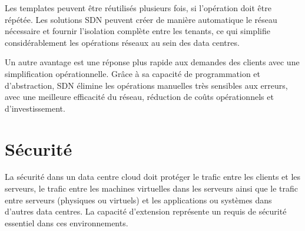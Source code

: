 Les templates peuvent être réutilisés plusieurs fois, si l'opération doit être répétée. Les solutions SDN peuvent créer de manière automatique le réseau nécessaire et fournir l'isolation complète entre les tenants, ce qui simplifie considérablement les opérations réseaux au sein des data centres. 

Un autre avantage est une réponse plus rapide aux demandes des clients avec une simplification opérationnelle. Grâce à sa capacité de programmation et d'abstraction, SDN élimine les opérations manuelles très sensibles aux erreurs, avec une meilleure efficacité du réseau, réduction de coûts opérationnels et d'investissement. \cite{leveragingSDNCloudNetworkServiceExample} \cite{leveragingSDNCloudDCWAN}

\section{Sécurité}

La sécurité dans un data centre cloud doit protéger le trafic entre les clients et les serveurs, le trafic entre les machines virtuelles dans les serveurs ainsi que le trafic entre serveurs (physiques ou virtuels) et les applications ou systèmes dans d'autres data centres. La capacité d'extension représente un requis de sécurité essentiel dans ces environnements. 




